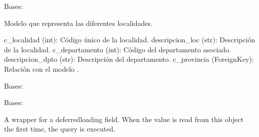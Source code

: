 \documentclass[letterpaper,10pt,spanish]{sphinxmanual}
\begin{document}
\begin{fulllineitems}

\pysigstartsignatures
{}
\pysigstopsignatures
\sphinxAtStartPar
Bases: 

\sphinxAtStartPar
Modelo que representa las diferentes localidades.
\begin{description}
\sphinxAtStartPar
c\_localidad (int): Código único de la localidad.
descripcion\_loc (str): Descripción de la localidad.
c\_departamento (int): Código del departamento asociado.
descripcion\_dpto (str): Descripción del departamento.
c\_provincia (ForeignKey): Relación con el modelo .

\end{description}


\begin{fulllineitems}

\pysigstartsignatures
{}
\pysigstopsignatures
\sphinxAtStartPar
Bases: 

\end{fulllineitems}



\begin{fulllineitems}

\pysigstartsignatures
{}
\pysigstopsignatures
\sphinxAtStartPar
Bases: 

\end{fulllineitems}



\begin{fulllineitems}

\pysigstartsignatures
{}
\pysigstopsignatures
\sphinxAtStartPar
A wrapper for a deferred\sphinxhyphen{}loading field. When the value is read from this
object the first time, the query is executed.

\end{fulllineitems}




\end{fulllineitems}
\end{document}
